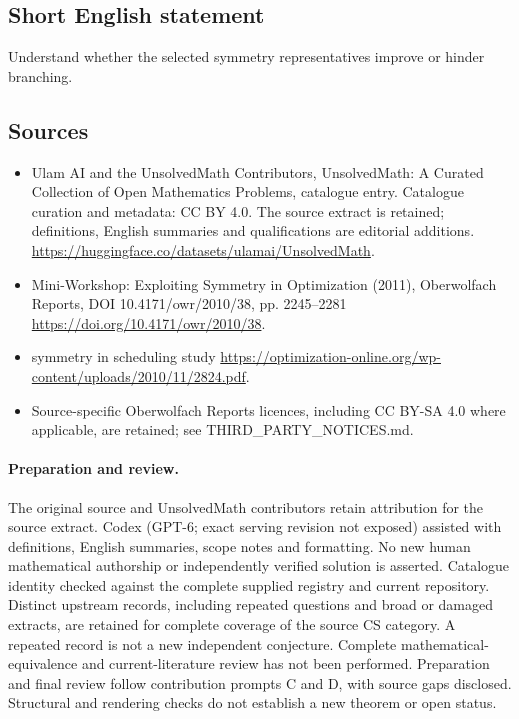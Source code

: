 \documentclass[11pt]{article}
\begin{document}
\subsection{Short English statement}
Understand whether the selected symmetry representatives improve or hinder branching.
\subsection{Sources}
\begin{itemize}
\item[\hypertarget{source:statement:1}{S1}] Ulam AI and the UnsolvedMath Contributors, UnsolvedMath: A Curated Collection of Open Mathematics Problems, catalogue entry. Catalogue curation and metadata: CC BY 4.0. The source extract is retained; definitions, English summaries and qualifications are editorial additions.
\url{https://huggingface.co/datasets/ulamai/UnsolvedMath}.
\item[\hypertarget{source:statement:2}{S2}] Mini-Workshop: Exploiting Symmetry in Optimization (2011), Oberwolfach Reports, DOI 10.4171/owr/2010/38, pp. 2245--2281
\url{https://doi.org/10.4171/owr/2010/38}.
\item[\hypertarget{source:statement:3}{S3}] symmetry in scheduling study
\url{https://optimization-online.org/wp-content/uploads/2010/11/2824.pdf}.
\item Source-specific Oberwolfach Reports licences, including CC BY-SA 4.0 where applicable, are retained; see THIRD\_PARTY\_NOTICES.md.
\end{itemize}
\paragraph{Preparation and review.}
The original source and UnsolvedMath contributors retain attribution for the source extract. Codex (GPT-6; exact serving revision not exposed) assisted with definitions, English summaries, scope notes and formatting. No new human mathematical authorship or independently verified solution is asserted. Catalogue identity checked against the complete supplied registry and current repository. Distinct upstream records, including repeated questions and broad or damaged extracts, are retained for complete coverage of the source CS category. A repeated record is not a new independent conjecture. Complete mathematical-equivalence and current-literature review has not been performed. Preparation and final review follow contribution prompts C and D, with source gaps disclosed. Structural and rendering checks do not establish a new theorem or open status.
\label{end:statement}
\end{document}
